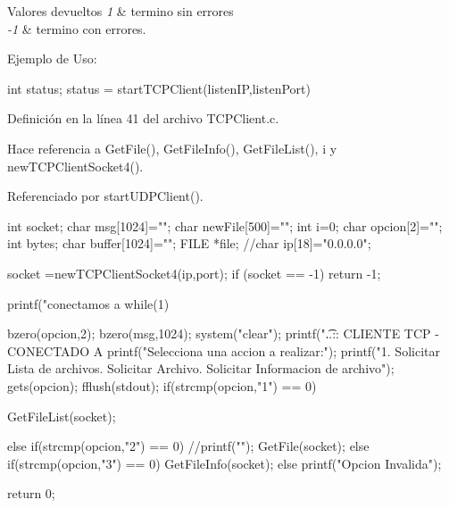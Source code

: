 \begin{DoxyRetVals}{Valores devueltos}
{\em 1} & termino sin errores \\
\hline
{\em -\/1} & termino con errores.\\
\hline
\end{DoxyRetVals}
Ejemplo de Uso: 
\begin{DoxyCode}
                int status;
                status = startTCPClient(listenIP,listenPort) 
\end{DoxyCode}
 

Definición en la línea 41 del archivo TCPClient.c.



Hace referencia a GetFile(), GetFileInfo(), GetFileList(), i y newTCPClientSocket4().



Referenciado por startUDPClient().


\begin{DoxyCode}
                                                       {

        int socket;
        char msg[1024]="";
        char newFile[500]="";
        int i=0;
        char opcion[2]="";
        int bytes;
        char buffer[1024]="";
        FILE *file;
        //char ip[18]="0.0.0.0";

        socket =newTCPClientSocket4(ip,port);
        if (socket == -1) {
                return -1;
        }
        
        printf("\nNos conectamos a %
        while(1){
                bzero(opcion,2);
                bzero(msg,1024);
                system("clear");
                printf("\t..:: CLIENTE TCP - CONECTADO A %
                printf("Selecciona una accion a realizar:\n");
                printf("1. Solicitar Lista de archivos. Solicitar Archivo. 
      Solicitar Informacion de archivo\n");
                gets(opcion);
                fflush(stdout);
                if(strcmp(opcion,"1") == 0) {
                        
                        GetFileList(socket);
                         }
                else if(strcmp(opcion,"2") == 0) {
                        //printf("\n");
                        GetFile(socket); }
                else if(strcmp(opcion,"3") == 0) {
                        GetFileInfo(socket); }
                else {
                        printf("Opcion Invalida\n");                    
                        }
                
        
        }
        
        return 0;
}
\end{DoxyCode}
